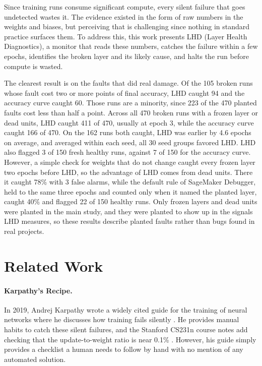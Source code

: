 \documentclass[11pt]{article}
\begin{document}
Since training runs consume significant compute, every silent failure that goes undetected wastes it. The evidence existed in the form of raw numbers in the weights and biases, but perceiving that is challenging since nothing in standard practice surfaces them. To address this, this work presents LHD (Layer Health Diagnostics), a monitor that reads these numbers, catches the failure within a few epochs, identifies the broken layer and its likely cause, and halts the run before compute is wasted.

The clearest result is on the faults that did real damage. Of the 105 broken runs whose fault cost two or more points of final accuracy, LHD caught 94 and the accuracy curve caught 60. Those runs are a minority, since 223 of the 470 planted faults cost less than half a point. Across all 470 broken runs with a frozen layer or dead units, LHD caught 411 of 470, usually at epoch 3, while the accuracy curve caught 166 of 470. On the 162 runs both caught, LHD was earlier by 4.6 epochs on average, and averaged within each seed, all 30 seed groups favored LHD. LHD also flagged 3 of 150 fresh healthy runs, against 7 of 150 for the accuracy curve. However, a simple check for weights that do not change caught every frozen layer two epochs before LHD, so the advantage of LHD comes from dead units. There it caught 78\% with 3 false alarms, while the default rule of SageMaker Debugger, held to the same three epochs and counted only when it named the planted layer, caught 40\% and flagged 22 of 150 healthy runs. Only frozen layers and dead units were planted in the main study, and they were planted to show up in the signals LHD measures, so these results describe planted faults rather than bugs found in real projects.


\section{Related Work}

\paragraph{Karpathy's Recipe.} In 2019, Andrej Karpathy wrote a widely cited guide for the training of neural networks where he discusses how training fails silently \citep{karpathy2019}. He provides manual habits to catch these silent failures, and the Stanford CS231n course notes add checking that the update-to-weight ratio is near 0.1\% \citep{cs231n}. However, his guide simply provides a checklist a human needs to follow by hand with no mention of any automated solution.
\end{document}
